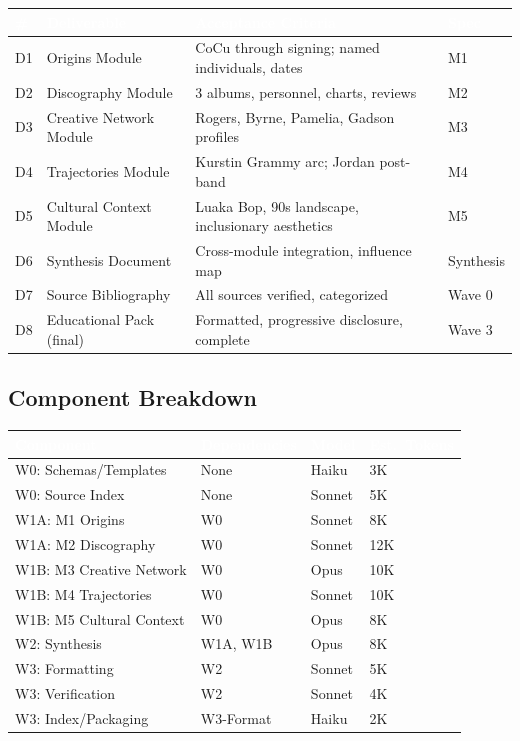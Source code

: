 \documentclass[11pt,letterpaper]{article}
\newcommand{\tableheader}[1]{\textbf{\sffamily\textcolor{white}{#1}}}
\begin{document}
\begin{center}
\begin{tabularx}{\textwidth}{C{0.8cm}L{3.5cm}XL{2.5cm}}
\toprule
{}
\tableheader{\#} & \tableheader{Deliverable} & \tableheader{Acceptance Criteria} & \tableheader{Spec} \\
\midrule
D1 & Origins Module & CoCu through signing; named individuals, dates & M1 \\
D2 & Discography Module & 3 albums, personnel, charts, reviews & M2 \\
D3 & Creative Network Module & Rogers, Byrne, Pamelia, Gadson profiles & M3 \\
D4 & Trajectories Module & Kurstin Grammy arc; Jordan post-band & M4 \\
D5 & Cultural Context Module & Luaka Bop, 90s landscape, inclusionary aesthetics & M5 \\
D6 & Synthesis Document & Cross-module integration, influence map & Synthesis \\
D7 & Source Bibliography & All sources verified, categorized & Wave 0 \\
D8 & Educational Pack (final) & Formatted, progressive disclosure, complete & Wave 3 \\
\bottomrule
\end{tabularx}
\end{center}

\subsection{Component Breakdown}

\begin{center}
\begin{tabularx}{\textwidth}{L{3.5cm}L{2.5cm}C{1.8cm}C{1.8cm}}
\toprule
{}
\tableheader{Component} & \tableheader{Dependencies} & \tableheader{Model} & \tableheader{Est.\ Tokens} \\
\midrule
W0: Schemas/Templates & None & Haiku & 3K \\
W0: Source Index & None & Sonnet & 5K \\
W1A: M1 Origins & W0 & Sonnet & 8K \\
W1A: M2 Discography & W0 & Sonnet & 12K \\
W1B: M3 Creative Network & W0 & Opus & 10K \\
W1B: M4 Trajectories & W0 & Sonnet & 10K \\
W1B: M5 Cultural Context & W0 & Opus & 8K \\
W2: Synthesis & W1A, W1B & Opus & 8K \\
W3: Formatting & W2 & Sonnet & 5K \\
W3: Verification & W2 & Sonnet & 4K \\
W3: Index/Packaging & W3-Format & Haiku & 2K \\
\bottomrule
\end{tabularx}
\end{center}
\end{document}
